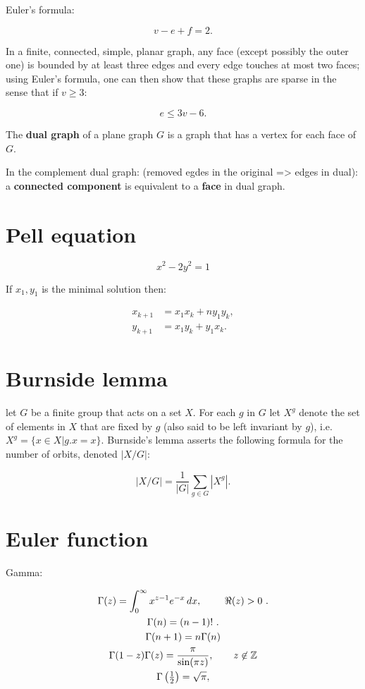 \documentclass[11pt]{article}
\begin{document}
\begin{multicols}{3}
Euler's formula:

$$v-e+f=2.$$

In a finite, connected, simple, planar graph, any face (except possibly the outer one) is bounded by at least three edges and every edge touches at most two faces; using Euler's formula, one can then show that these graphs are sparse in the sense that if $v \geq 3$:

$$e\leq 3v-6.$$

The \textbf{dual graph} of a plane graph $G$ is a graph that has a vertex for each face of $G$.

In the complement dual graph: (removed egdes in the original => edges in dual): a \textbf{connected component} is equivalent to a \textbf{face} in dual graph.

\section{Pell equation}

 $$x^2 - 2y^2=1$$
 
 If $x_1, y_1$ is the minimal solution then:
 
 \begin{align*}
    x_{k+1}&=x_{1}x_{k}+ny_{1}y_{k},\\
    y_{k+1} &= x_1 y_k + y_1 x_k.
 \end{align*}

\section{Burnside lemma}

let $G$ be a finite group that acts on a set $X$. For each $g$ in $G$ let $X^g$ denote the set of elements in $X$ that are fixed by $g$ (also said to be left invariant by $g$), i.e. $X^g = \{ x \in X | g.x = x \}$. Burnside's lemma asserts the following formula for the number of orbits, denoted $|X/G|$:

$$ |X/G|={\frac {1}{|G|}}\sum _{g\in G}|X^{g}|.$$

\section{Euler function}

Gamma:

\begin{gather*}
\Gamma (z)=\int _{0}^{\infty }x^{z-1}e^{-x}\,dx,\ \qquad \Re (z)>0\ .\\
\Gamma (n)=(n-1)!\ .\\
  \Gamma (n+1)=n\Gamma (n)\\
  \Gamma (1-z)\Gamma (z)={\pi  \over \sin(\pi z)},\qquad z\not \in \mathbb {Z} \\
 \Gamma \left({\tfrac {1}{2}}\right)={\sqrt {\pi }},\\
\end{gather*}


\end{multicols}
\end{document}
